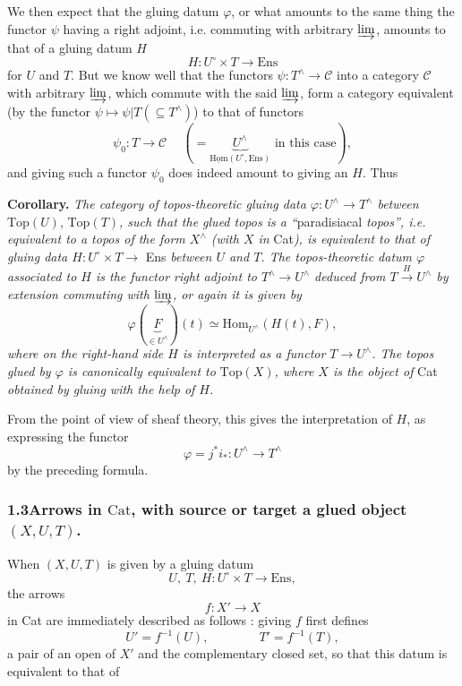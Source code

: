 \documentclass[11pt]{article}
\newcommand{\printedpage}[1]{\marginpar{\footnotesize p.~#1}}
\newcommand{\msp}[1]{\marginpar{\footnotesize [#1]}}
\newcommand{\uHom}{\underline{\mathrm{Hom}}}
\begin{document}
We then expect that the gluing datum $\varphi$, or what amounts to the same thing the functor $\psi$ having a right adjoint, i.e. commuting with arbitrary $\varinjlim$, amounts to that of a gluing datum $H$
\[
H : U^\circ \times T \longrightarrow \mathrm{Ens}
\]
for $U$ and $T$. But we know well that the functors $\psi : T^\wedge \longrightarrow \mathcal{C}$ into a category $\mathcal{C}$ with arbitrary $\varinjlim$, which commute with the said $\varinjlim$, form a category equivalent (by the functor $\psi \longmapsto \psi|T(\subseteq T^\wedge)$) to that of functors
\[
\psi_0 : T \longrightarrow \mathcal{C} \quad\ (= \underbrace{U^\wedge}_{\uHom(U^\circ,\mathrm{Ens})} \text{ in this case}),
\]
\msp{page 64}
and giving such a functor $\psi_0$ does indeed amount to giving an $H$. Thus

\textbf{Corollary.} \textit{The category of topos-theoretic gluing data $\varphi : U^\wedge \longrightarrow T^\wedge$ between} $\mathrm{Top}(U)$, $\mathrm{Top}(T)$\textit{, such that the glued topos is a ``}paradisiacal\textit{ topos'', i.e. equivalent to a topos of the form $X^\wedge$ (with $X$ in} Cat\textit{), is equivalent to that of gluing data $H : U^\circ \times T \longrightarrow$} Ens \textit{between $U$ and $T$. The topos-theoretic datum $\varphi$ associated to $H$ is the functor right adjoint to $T^\wedge \longrightarrow U^\wedge$ deduced from $T \xrightarrow{H} U^\wedge$ by extension commuting with $\varinjlim$, or again it is given by}
\[
\varphi(\underbrace{F}_{\in U^\wedge})(t) \simeq \mathrm{Hom}_{U^\wedge}(H(t),F),
\]
\textit{where on the right-hand side $H$ is interpreted as a functor $T \longrightarrow U^\wedge$. The topos glued by $\varphi$ is canonically equivalent to} $\mathrm{Top}(X)$\textit{, where $X$ is the object of} Cat \textit{obtained by gluing with the help of $H$.}

From the point of view of sheaf theory, this gives the interpretation of $H$, as expressing the functor
\[
\varphi = j^*i_* : U^\wedge \longrightarrow T^\wedge
\]
by the preceding formula.

\printedpage{47}

\msp{page 65}

\subsubsection*{1.3\quad Arrows in $\mathrm{Cat}$, with source or target a glued object $(X,U,T)$.}

When $(X,U,T)$ is given by a gluing datum
\[
U,\ T,\ H : U^\circ \times T \longrightarrow \mathrm{Ens},
\]
the arrows
\[
f : X' \longrightarrow X
\]
in Cat are immediately described as follows : giving $f$ first defines
\[
U' = f^{-1}(U), \qquad\qquad T' = f^{-1}(T),
\]
a pair of an open of $X'$ and the complementary closed set, so that this datum is equivalent to that of
\end{document}
